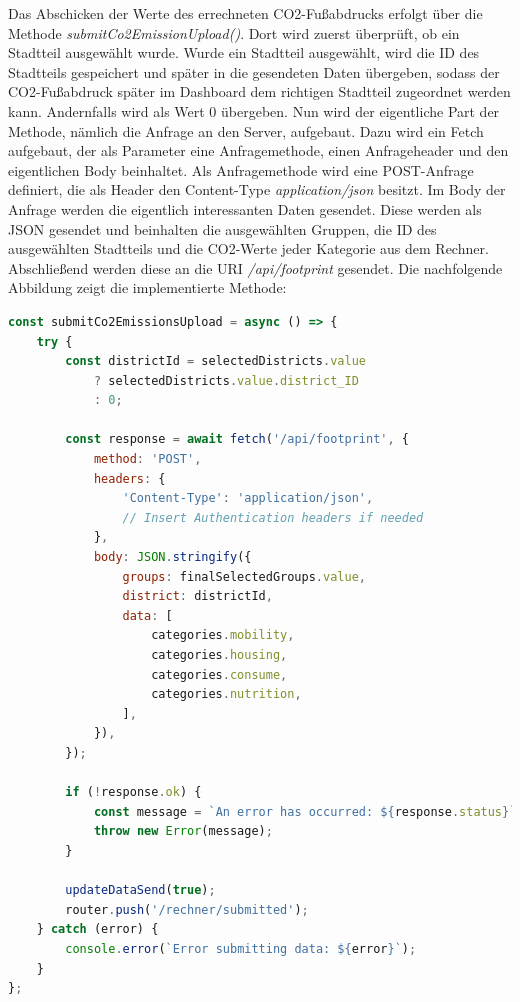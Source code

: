 Das Abschicken der Werte des errechneten CO2-Fußabdrucks erfolgt über die Methode \textit{submitCo2EmissionUpload()}.
Dort wird zuerst überprüft, ob ein Stadtteil ausgewählt wurde.
Wurde ein Stadtteil ausgewählt, wird die ID des Stadtteils gespeichert und später in die gesendeten Daten übergeben, sodass der CO2-Fußabdruck später im Dashboard dem richtigen Stadtteil zugeordnet werden kann.
Andernfalls wird als Wert 0 übergeben.
Nun wird der eigentliche Part der Methode, nämlich die Anfrage an den Server, aufgebaut.
Dazu wird ein Fetch aufgebaut, der als Parameter eine Anfragemethode, einen Anfrageheader und den eigentlichen Body beinhaltet.
Als Anfragemethode wird eine POST-Anfrage definiert, die als Header den Content-Type \textit{application/json} besitzt.
Im Body der Anfrage werden die eigentlich interessanten Daten gesendet.
Diese werden als JSON gesendet und beinhalten die ausgewählten Gruppen, die ID des ausgewählten Stadtteils und die CO2-Werte jeder Kategorie aus dem Rechner.
Abschließend werden diese an die URI \textit{/api/footprint} gesendet.
Die nachfolgende Abbildung zeigt die implementierte Methode:

\begin{lstlisting}[language={JavaScript}, caption={submitCo2EmissionUpload()-Methode}, label={lst:upload-methode}]
    const submitCo2EmissionsUpload = async () => {
    try {
        const districtId = selectedDistricts.value
            ? selectedDistricts.value.district_ID
            : 0;

        const response = await fetch('/api/footprint', {
            method: 'POST',
            headers: {
                'Content-Type': 'application/json',
                // Insert Authentication headers if needed
            },
            body: JSON.stringify({
                groups: finalSelectedGroups.value,
                district: districtId,
                data: [
                    categories.mobility,
                    categories.housing,
                    categories.consume,
                    categories.nutrition,
                ],
            }),
        });

        if (!response.ok) {
            const message = `An error has occurred: ${response.status}`;
            throw new Error(message);
        }

        updateDataSend(true);
        router.push('/rechner/submitted');
    } catch (error) {
        console.error(`Error submitting data: ${error}`);
    }
};
\end{lstlisting}

